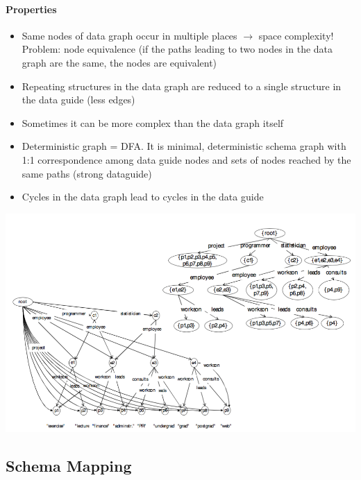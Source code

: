 \paragraph{Properties}
\begin{itemize}
\item Same nodes of data graph occur in multiple places $\rightarrow$ space complexity! Problem: node equivalence (if the paths leading to two nodes in the data graph are the same, the nodes are equivalent)
\item Repeating structures in the data graph are reduced to a single structure in the data guide (less edges)
\item Sometimes it can be more complex than the data graph itself
\item Deterministic graph = DFA. It is minimal, deterministic schema graph with 1:1  correspondence among data guide nodes and sets of nodes reached by the  same paths (strong dataguide)
\item Cycles in the data graph lead to cycles in the data guide
\end{itemize}
\includegraphics[width=\textwidth]{figures/data_guide.png}
\subsection{Schema Mapping}

